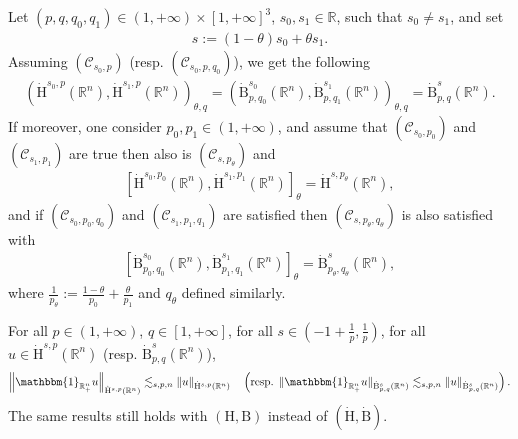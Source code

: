 \documentclass[10pt]{amsart}
\theoremstyle{definition}\newtheorem{defi}[theo]{Definition}\newtheorem{rema}[theo]{Remark}\newtheorem{exam}[theo]{Example}\newtheorem{exem}[theo]{Example}\newtheorem{nota}[theo]{Notation}
\newcommand{\bbR}{\mathbb{R}}
\newcommand{\rmH}{\mathrm{H}}%
\newcommand{\rmB}{\mathrm{B}}
\newcommand{\clC}{\mathcal{C}}
\begin{document}
\begin{prop}\label{prop:InterpHomSpacesRn}
Let $(p,q,q_0,q_1)\in(1,+\infty)\times[1,+\infty]^3$, $s_0,s_1\in\bbR$, such that $s_0\neq s_1$, and set
\begin{align*}
s:= (1-\theta)s_0+ \theta s_1.
\end{align*}
Assuming $(\clC_{s_0,p})$ (resp. $(\clC_{s_0,p,q_0})$), we get the following
\begin{align}\label{eq:realInterpHomBspqRn}
\left(\dot{\rmH}^{s_0,p}(\bbR^n),\dot{\rmH}^{s_1,p}(\bbR^n)\right)_{\theta,q}= \left(\dot{\rmB}^{s_0}_{p,q_0}(\bbR^n),\dot{\rmB}^{s_1}_{p,q_1}(\bbR^n)\right)_{\theta,q}=\dot{\rmB}^{s}_{p,q}(\bbR^n).
\end{align}
If moreover, one consider $p_0,p_1\in(1,+\infty)$, and assume that $(\clC_{s_0,p_0})$ and $(\clC_{s_1,p_1})$ are true then also is $(\clC_{s,p_\theta})$ and
\begin{align}\label{eq:complexInterpHomHspRn}
\left[\dot{\rmH}^{s_0,p_0}(\bbR^n),\dot{\rmH}^{s_1,p_1}(\bbR^n)\right]_{\theta} = \dot{\rmH}^{s,p_\theta}(\bbR^n),
\end{align}
and if $(\clC_{s_0,p_0,q_0})$ and $(\clC_{s_1,p_1,q_1})$ are satisfied then $(\clC_{s,p_\theta,q_\theta})$ is also satisfied with
\begin{align}\label{eq:complexInterpHomBspqRn}
\left[\dot{\rmB}^{s_0}_{p_0,q_0}(\bbR^n),\dot{\rmB}^{s_1}_{p_1,q_1}(\bbR^n)\right]_{\theta} = \dot{\rmB}^{s}_{p_\theta,q_\theta}(\bbR^n),
\end{align}
where $\frac{1}{p_\theta}:=\frac{1-\theta}{p_0}+\frac{\theta}{p_1}$ and $q_\theta$ defined similarly.
\end{prop}


\begin{prop}\label{prop:SobolevMultiplier}
For all $p\in(1,+\infty)$, $q\in[1,+\infty]$, for all $s\in (-1+\frac{1}{p},\frac{1}{p})$, for all $u\in\dot{\rmH}^{s,p}(\bbR^n)$ (resp. $\dot{\rmB}^{s}_{p,q}(\bbR^{n})$),
\begin{align*}
\left\| \mathbbm{1}_{\bbR^n_+} u \right\|_{\dot{\rmH}^{s,p}(\bbR^{n})} \lesssim_{s,p,n} \| u \|_{\dot{\rmH}^{s,p}(\bbR^{n})} \quad\left(\text{resp. } \| \mathbbm{1}_{\bbR^n_+} u \|_{\dot{\rmB}^{s}_{p,q}(\bbR^{n})} \lesssim_{s,p,n} \| u \|_{\dot{\rmB}^{s}_{p,q}(\bbR^{n})}\right).
\end{align*}
The same results still holds with $({\rmH},{\rmB})$ instead of $(\dot{\rmH},\dot{\rmB})$.
\end{prop}
\end{document}
